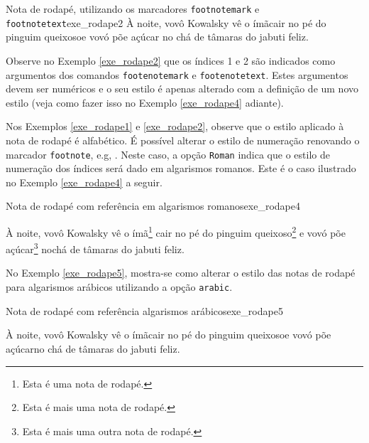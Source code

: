 
\begingroup
\renewcommand*{\thefootnote}{\alph{footnote}}
\begin{texexptitled}[breakable,enhanced,middle=2mm]{Nota de rodapé, utilizando os marcadores {\tt footnotemark} e {\tt footnotetext}}{exe_rodape2}
À noite, vovô Kowalsky vê o ímã\footnotemark[1] cair no pé do pinguim queixoso\footnotemark[2] e vovó põe açúcar no chá de tâmaras do jabuti feliz.

\end{texexptitled}
\endgroup

Observe no Exemplo \ref{exe_rodape2} que os índices 1 e 2 são indicados como argumentos dos comandos {\tt footenotemark} e {\tt footenotetext}. Estes argumentos devem ser numéricos e o seu estilo é apenas alterado com a definição de um novo estilo (veja como fazer isso no Exemplo \ref{exe_rodape4} adiante).

Nos Exemplos \ref{exe_rodape1} e \ref{exe_rodape2}, observe que o estilo aplicado à nota de rodapé é alfabético. É possível alterar o estilo de numeração renovando o marcador {\tt footnote}, e.g, \texttt{\renewcommand{\thefootnote}{\roman{footnote}}}. Neste caso, a opção {\tt Roman} indica que o estilo de numeração dos índices será dado em algarismos romanos. Este é o caso ilustrado no Exemplo \ref{exe_rodape4} a seguir.

\begingroup
\renewcommand*{\thempfootnote}{\Roman{mpfootnote}}
\begin{texexptitled}[breakable,enhanced,middle=2mm]{Nota de rodapé com referência em algarismos romanos}{exe_rodape4}
\renewcommand{\thefootnote}{\Roman{footnote}}

À noite, vovô Kowalsky vê o ímã\footnote{Esta é uma nota de rodapé.} cair no pé do pinguim queixoso\footnote{Esta é mais uma nota de rodapé.} e vovó põe açúcar\footnote{Esta é mais uma outra nota de rodapé.} nochá de tâmaras do jabuti feliz.
\end{texexptitled}
\endgroup

No Exemplo \ref{exe_rodape5}, mostra-se como alterar o estilo das notas de rodapé para algarismos arábicos utilizando a opção {\tt arabic}.

\begingroup
\renewcommand{\thempfootnote}{\arabic{mpfootnote}}
\begin{texexptitled}[breakable,enhanced,middle=2mm]{Nota de rodapé com referência algarismos arábicos}{exe_rodape5}
\renewcommand*{\thefootnote}{\arabic{footnote}}

À noite, vovô Kowalsky vê o ímã\footnotemark[1] cair no pé do pinguim queixoso\footnotemark[2] e vovó põe açúcar\footnotemark[3] no chá de tâmaras do jabuti feliz.

\end{texexptitled}
\endgroup

